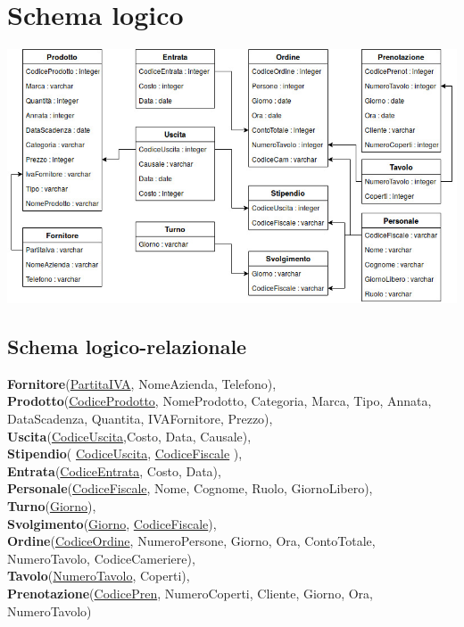 \section{Schema logico}
\includegraphics[width=1\textwidth]{doc/schemaLogico}
\subsection{Schema logico-relazionale} %
\textbf{Fornitore}(\underline{PartitaIVA}, NomeAzienda, Telefono), \\ \smallskip
\textbf{Prodotto}(\underline{CodiceProdotto}, NomeProdotto, Categoria, Marca, Tipo, Annata, DataScadenza, Quantita, IVAFornitore, Prezzo), \\ \smallskip
\textbf{Uscita}(\underline{CodiceUscita},Costo, Data, Causale), \\ \smallskip
\textbf{Stipendio}( \underline{CodiceUscita}, \underline{CodiceFiscale} ), \\ \smallskip
\textbf{Entrata}(\underline{CodiceEntrata}, Costo, Data), \\ \smallskip
\textbf{Personale}(\underline{CodiceFiscale}, Nome, Cognome, Ruolo, GiornoLibero), \\ \smallskip
\textbf{Turno}(\underline{Giorno}), \\ \smallskip
\textbf{Svolgimento}(\underline{Giorno}, \underline{CodiceFiscale}), \\ \smallskip
\textbf{Ordine}(\underline{CodiceOrdine}, NumeroPersone, Giorno, Ora, ContoTotale, NumeroTavolo, CodiceCameriere), \\ \smallskip 
\textbf{Tavolo}(\underline{NumeroTavolo}, Coperti), \\ \smallskip
\textbf{Prenotazione}(\underline{CodicePren}, NumeroCoperti, Cliente, Giorno, Ora, NumeroTavolo)

